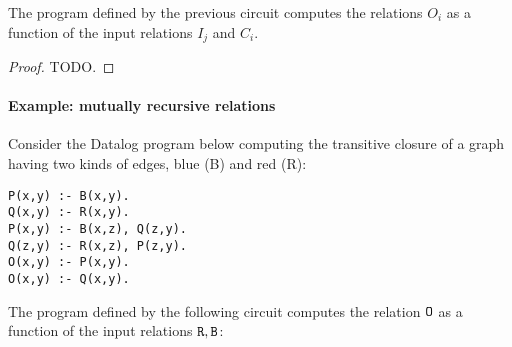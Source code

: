 \begin{enumerate}
\end{enumerate}

\begin{theorem}
The program defined by the previous circuit computes 
the relations $O_i$ as a function of the input relations $I_j$ and $C_i$.
\end{theorem}
\begin{proof}
TODO.
\end{proof}

\paragraph{Example: mutually recursive relations}

Consider the Datalog program below computing the transitive closure of a graph
having two kinds of edges, blue (B) and red (R):

\begin{lstlisting}[language=ddlog]
P(x,y) :- B(x,y).
Q(x,y) :- R(x,y).
P(x,y) :- B(x,z), Q(z,y).
Q(z,y) :- R(x,z), P(z,y).
O(x,y) :- P(x,y).
O(x,y) :- Q(x,y).
\end{lstlisting}

The program defined by the following circuit computes 
the relation $\mbox{\texttt{O}}$ as a function of the input relations $\mbox{\texttt{R}}, \mbox{\texttt{B}}$:


